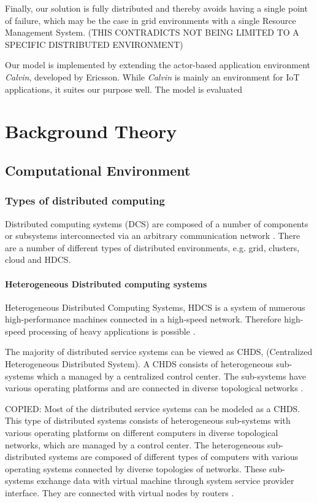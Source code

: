 \documentclass{cslthse-msc}
\begin{document}
Finally, our solution is fully distributed and thereby avoids having a single point of failure, which may be the case in grid environments with a single Resource Management System. (THIS CONTRADICTS NOT BEING LIMITED TO A SPECIFIC DISTRIBUTED ENVIRONMENT)

Our model is implemented by extending the actor-based application environment \emph{Calvin}, developed by Ericsson. While \emph{Calvin} is mainly an environment for IoT applications, it suites our purpose well. The model is evaluated %

\chapter{Background Theory} \label{ch:background_theory}
\section{Computational Environment}
\subsection{Types of distributed computing}
Distributed computing systems (DCS) are composed of a number of components or subsystems interconnected via an arbitrary communication network \cite{relModelDistSimSystem} \cite{efficientRelAnalysisAlgo}. There are a number of different types of distributed environments, e.g. grid, clusters, cloud and HDCS.

\subsubsection{Heterogeneous Distributed computing systems}
Heterogeneous Distributed Computing Systems, HDCS is a system of numerous high-performance machines connected in a high-speed network. Therefore high-speed processing of heavy applications is possible \cite{algoMinExTime}. %

The majority of distributed service systems can be viewed as CHDS, (Centralized Heterogeneous Distributed System). A CHDS consists of heterogeneous sub-systems which a managed by a centralized control center. The sub-systems have various operating platforms and are connected in diverse topological networks \cite{studyServiceRel}.

COPIED: Most of the distributed service systems can be modeled as a CHDS. This type of distributed systems consists of heterogeneous sub-systems with various operating platforms on different computers in diverse topological networks, which are managed by a control center. The heterogeneous sub-distributed systems are composed of different types of computers with various operating systems connected by diverse topologies of networks. These sub-systems exchange data with virtual machine through system service provider interface. They are connected with virtual nodes by routers \cite{studyServiceRel}.
\end{document}

